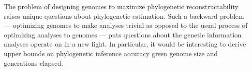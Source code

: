 The problem of designing genomes to maximize phylogenetic reconstructability raises unique questions about phylogenetic estimation.
Such a backward problem --- optimizing genomes to make analyses trivial as opposed to the usual process of optimizing analyses to genomes --- puts questions about the genetic information analyses operate on in a new light.
In particular, it would be interesting to derive upper bounds on phylogenetic inference accuracy given genome size and generations elapsed.
